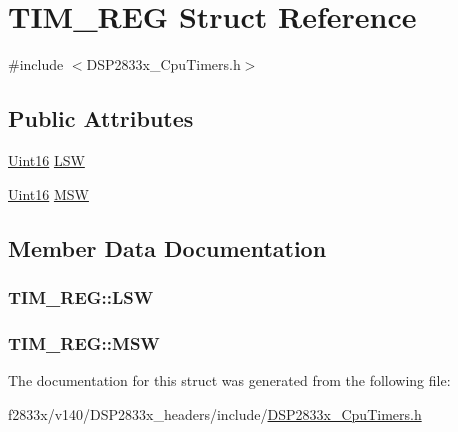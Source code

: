 \hypertarget{struct_t_i_m___r_e_g}{}\section{T\+I\+M\+\_\+\+R\+E\+G Struct Reference}
\label{struct_t_i_m___r_e_g}


{\ttfamily \#include $<$D\+S\+P2833x\+\_\+\+Cpu\+Timers.\+h$>$}

\subsection*{Public Attributes}
\begin{DoxyCompactItemize}
\item 
\hyperlink{_d_s_p2833x___device_8h_a59a9f6be4562c327cbfb4f7e8e18f08b}{Uint16} \hyperlink{struct_t_i_m___r_e_g_aa98fbaafc727b39becb1c9c25c24e8bc}{L\+S\+W}
\item 
\hyperlink{_d_s_p2833x___device_8h_a59a9f6be4562c327cbfb4f7e8e18f08b}{Uint16} \hyperlink{struct_t_i_m___r_e_g_a76fb2e0150980831732703af5d52267e}{M\+S\+W}
\end{DoxyCompactItemize}


\subsection{Member Data Documentation}
\hypertarget{struct_t_i_m___r_e_g_aa98fbaafc727b39becb1c9c25c24e8bc}{}
\subsubsection[{L\+S\+W}]{ T\+I\+M\+\_\+\+R\+E\+G\+::\+L\+S\+W}\label{struct_t_i_m___r_e_g_aa98fbaafc727b39becb1c9c25c24e8bc}
\hypertarget{struct_t_i_m___r_e_g_a76fb2e0150980831732703af5d52267e}{}
\subsubsection[{M\+S\+W}]{ T\+I\+M\+\_\+\+R\+E\+G\+::\+M\+S\+W}\label{struct_t_i_m___r_e_g_a76fb2e0150980831732703af5d52267e}


The documentation for this struct was generated from the following file\+:\begin{DoxyCompactItemize}
\item 
f2833x/v140/\+D\+S\+P2833x\+\_\+headers/include/\hyperlink{_d_s_p2833x___cpu_timers_8h}{D\+S\+P2833x\+\_\+\+Cpu\+Timers.\+h}\end{DoxyCompactItemize}
